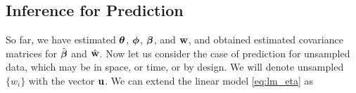 \documentclass[12pt, titlepage]{article}
\begin{document}

\subsection{Inference for Prediction} \label{sec:pred_infer}

So far, we have estimated $\boldsymbol{\theta}$, $\boldsymbol{\phi}$, $\boldsymbol{\beta}$, and $\mathbf{w}$, and obtained estimated covariance matrices for $\hat{\boldsymbol{\beta}}$ and $\hat{\mathbf{w}}$.  Now let us consider the case of prediction for unsampled data, which may be in space, or time, or by design.  We will denote unsampled $\{w_{i}\}$ with the vector $\mathbf{u}$.  We can extend the linear model \eqref{eq:lm_eta} as
\end{document}
